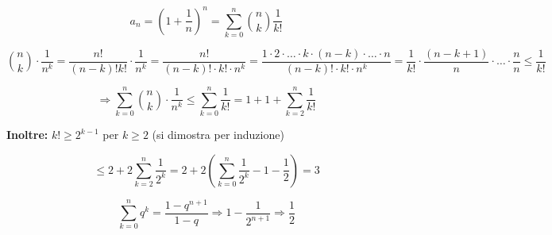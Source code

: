\documentclass{article}
\theoremstyle{definition}
\begin{document}
\[
a_n = \left(1+\frac{1}{n}\right)^n = \sum_{k=0}^{n} \binom{n}{k} \frac{1}{k!}
\]

\[
\binom{n}{k} \cdot \frac{1}{n^k} = \frac{n!}{(n-k)!k!} \cdot \frac{1}{n^k} = \frac{n!}{(n-k)! \cdot k! \cdot n^k}
= \frac{1 \cdot 2 \cdot \ldots \cdot k \cdot (n-k) \cdot \ldots \cdot n}{(n-k)! \cdot k! \cdot n^k}
= \frac{1}{k!} \cdot \frac{(n-k+1)}{n}\cdot \ldots \cdot \frac{n}{n} \leqslant \frac{1}{k!}
\]

\[
\Rightarrow \sum_{k=0}^{n} \binom{n}{k} \cdot \frac{1}{n^k} \leqslant \sum_{k=0}^{n} \frac{1}{k!}
=1 +1 + \sum_{k=2}^{n}  \frac{1}{k!}
\]


\textbf{Inoltre:} \quad $k! \geq 2^{k-1}$ \quad per $k \geq 2$ \quad (si dimostra per induzione)

\[
\leq 2 + 2\sum_{k=2}^{n} \frac{1}{2^k} = 2 + 2\left(\sum_{k=0}^{n} \frac{1}{2^{k}}-1-\frac{1}{2}\right)=3
\]

\[
\sum_{k=0}^{n} q^k = \frac{1 - q^{n+1}}{1 - q} \Rightarrow 1 - \frac{1}{2^{n+1}} \Rightarrow \frac{1}{2}
\]
\newpage
\end{document}
